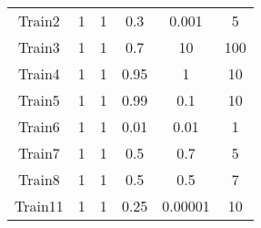 \documentclass[11pt,fleqn]{book} %
\begin{document}
\begin{table}[h!]
\begin{tabular}{ c c c c c c }
																																																																																																																																																																																																																																	          Train2 & 1 & 1 & 0.3 & 0.001 & 5\\
																																																																																																																																																																																																																																		      Train3 & 1 & 1 & 0.7 & 10 & 100\\
																																																																																																																																																																																																																																		          Train4 & 1 & 1 & 0.95 & 1 & 10\\
																																																																																																																																																																																																																																			      Train5 & 1 & 1 & 0.99 & 0.1 & 10\\
																																																																																																																																																																																																																																			          Train6 & 1 & 1 & 0.01 & 0.01 & 1\\
																																																																																																																																																																																																																																				      Train7 & 1 & 1 & 0.5 & 0.7 & 5\\
																																																																																																																																																																																																																																				          Train8 & 1 & 1 & 0.5 & 0.5 & 7\\
																																																																																																																																																																																																																																					      Train11 & 1 & 1 & 0.25 & 0.00001 & 10\\
																																																																																																																																																																																																																																					          

\end{tabular}
\end{table}
\end{document}
